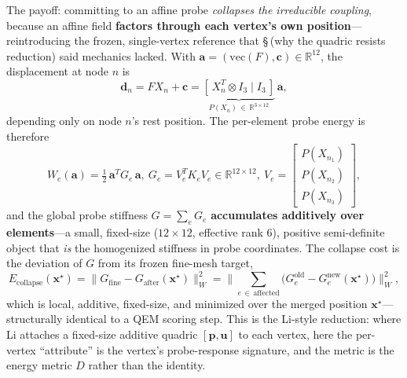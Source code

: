 The payoff: committing to an affine probe \emph{collapses the irreducible coupling}, because an affine field \textbf{factors through each vertex's own position}---reintroducing the frozen, single-vertex reference that \S\,(why the quadric resists reduction) said mechanics lacked.
With $\mathbf{a} = (\mathrm{vec}(F),\mathbf{c})\in\mathbb{R}^{12}$, the displacement at node $n$ is
\begin{equation}
  \mathbf{d}_n = F X_n + \mathbf{c}
    = \underbrace{[\,X_n^T\otimes I_3 \mid I_3\,]}_{P(X_n)\,\in\,\mathbb{R}^{3\times12}}
      \,\mathbf{a},
\end{equation}
depending only on node $n$'s rest position.
The per-element probe energy is therefore
\begin{equation}
  W_e(\mathbf{a}) = \tfrac12\,\mathbf{a}^T G_e\,\mathbf{a},
  \
  G_e = V_e^T K_e V_e \in \mathbb{R}^{12\times12},
  \
  V_e = \begin{bmatrix} P(X_{n_1}) \\ P(X_{n_2}) \\ P(X_{n_3}) \end{bmatrix},
\end{equation}
and the global probe stiffness $G = \sum_e G_e$ \textbf{accumulates additively over elements}---a small, fixed-size ($12\times12$, effective rank $6$), positive semi-definite object that \emph{is} the homogenized stiffness in probe coordinates.
The collapse cost is the deviation of $G$ from its frozen fine-mesh target,
\begin{equation}
  E_{\text{collapse}}(\mathbf{x}^\star)
    = \big\| G_{\text{fine}} - G_{\text{after}}(\mathbf{x}^\star) \big\|_W^2
    = \Big\| \sum_{e\,\in\,\text{affected}}
        \big( G_e^{\text{old}} - G_e^{\text{new}}(\mathbf{x}^\star) \big) \Big\|_W^2,
\end{equation}
which is local, additive, fixed-size, and minimized over the merged position $\mathbf{x}^\star$---structurally identical to a QEM scoring step.
This is the Li-style reduction: where Li attaches a fixed-size additive quadric $[\mathbf{p},\mathbf{u}]$ to each vertex, here the per-vertex ``attribute'' is the vertex's probe-response signature, and the metric is the energy metric $D$ rather than the identity.

